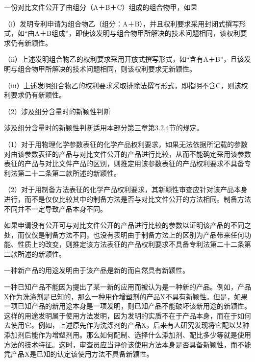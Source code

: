 一份对比文件公开了由组分（A＋B＋C）组成的组合物甲，如果

{\setlength{\parindent}{17.1bp}（i）发明专利申请为组合物乙（组分：A＋B），并且权利要求采用封闭式撰写形式，如“由A＋B组成”，即使该发明与组合物甲所解决的技术问题相同，该权利要求仍有新颖性。\par}

{\setlength{\parindent}{17.1bp}（ii）上述发明组合物乙的权利要求采用开放式撰写形式，如“含有A＋B”，且该发明与组合物甲所解决的技术问题相同，则该权利要求无新颖性。\par}

{\setlength{\parindent}{17.1bp}（iii）上述发明组合物乙的权利要求采取排除法撰写形式，即指明不含C，则该权利要求仍有新颖性。\par}

{\setlength{\parindent}{17.1bp}（2）涉及组分含量时的新颖性判断\par}

涉及组分含量时的新颖性判断适用本部分第三章第3.2.4节的规定。

{\setlength{\parindent}{17.1bp}（1）对于用物理化学参数表征的化学产品权利要求，如果无法依据所记载的参数对由该参数表征的产品与对比文件公开的产品进行比较，从而不能确定采用该参数表征的产品与对比文件产品的区别，则推定用该参数表征的产品权利要求不具备专利法第二十二条第二款所述的新颖性。\par}

{\setlength{\parindent}{17.1bp}（2）对于用制备方法表征的化学产品权利要求，其新颖性审查应针对该产品本身进行，而不是仅仅比较其中的制备方法是否与对比文件公开的方法相同。制备方法不同并不一定导致产品本身不同。\par}

如果申请没有公开可与对比文件公开的产品进行比较的参数以证明该产品的不同之处，而仅仅是制备方法不同，也没有表明由于制备方法上的区别为产品带来任何功能、性质上的改变，则推定该方法表征的产品权利要求不具备专利法第二十二条第二款所述的新颖性。

一种新产品的用途发明由于该产品是新的而自然具有新颖性。

一种已知产品不能因为提出了某一新的应用而被认为是一种新的产品。例如，产品X作为洗涤剂是已知的，那么一种用作增塑剂的产品X不具有新颖性。但是，如果一项已知产品的新用途本身是一项发明，则已知产品不能破坏该新用途的新颖性。这样的用途发明属于使用方法发明，因为发明的实质不在于产品本身，而在于如何去使用它。例如，上述原先作为洗涤剂的产品X，后来有人研究发现将它配以某种添加剂后能作为增塑剂用。那么如何配制、选择什么添加剂、配比多少等就是使用方法的技术特征。这时，审查员应当评价该使用方法本身是否具备新颖性，而不能凭产品X是已知的认定该使用方法不具备新颖性。

